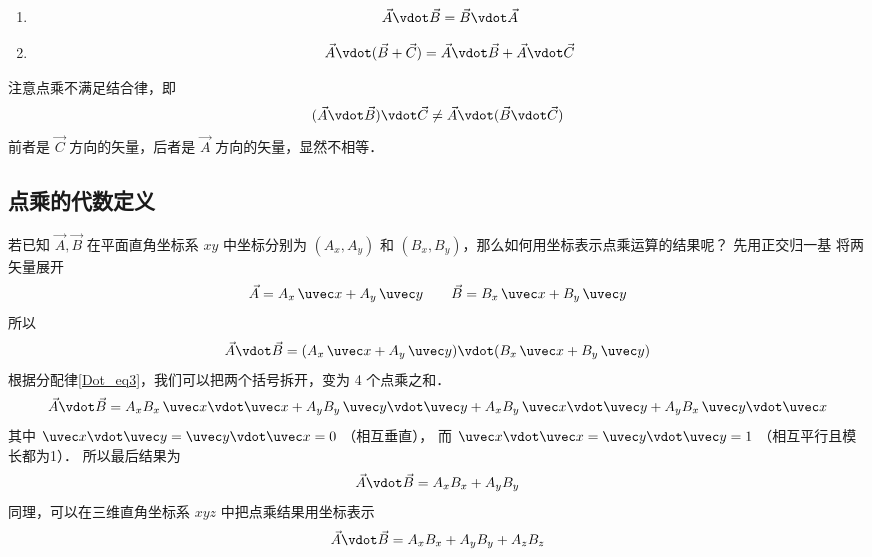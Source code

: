 \begin{enumerate}
\item {}
\begin{equation}
\vec A \vdot \vec B = \vec B \vdot \vec A
\end{equation}

\item {}
\begin{equation}\label{Dot_eq3}
\vec A \vdot (\vec B + \vec C) = \vec A \vdot \vec B + \vec A \vdot \vec C
\end{equation}
\end{enumerate}

注意点乘不满足结合律，即
\begin{equation}
(\vec A \vdot \vec B) \vdot \vec C \ne  \vec A \vdot (\vec B \vdot \vec C)
\end{equation}
前者是 $\vec C$ 方向的矢量，后者是 $\vec A$ 方向的矢量，显然不相等．

\subsection{点乘的代数定义}

若已知 $\vec A, \vec B$ 在平面直角坐标系 $xy$ 中坐标分别为 $(A_x, A_y)$ 和  $(B_x, B_y)$，那么如何用坐标表示点乘运算的结果呢？ 先用正交归一基 将两矢量展开 %
\begin{equation}
\vec A = A_x \,\uvec x + A_y \,\uvec y \qquad \vec B = B_x \,\uvec x + B_y \,\uvec y
\end{equation}
所以
\begin{equation}
\vec A \vdot \vec B = (A_x \,\uvec x + A_y \,\uvec y) \vdot (B_x \,\uvec x + B_y \,\uvec y)
\end{equation}
根据分配律\autoref{Dot_eq3}，我们可以把两个括号拆开，变为 4 个点乘之和． 
\begin{equation}
\vec A \vdot \vec B = A_x B_x \,\uvec x \vdot \uvec x + A_y B_y \,\uvec y \vdot \uvec y + A_x B_y \,\uvec x \vdot \uvec y + A_y B_x \,\uvec y \vdot \uvec x
\end{equation}
其中 $\uvec x \vdot \uvec y = \uvec y \vdot \uvec x = 0$ （相互垂直）， 而 $\uvec x \vdot \uvec x = \uvec y \vdot \uvec y = 1$ （相互平行且模长都为1）． 所以最后结果为
\begin{equation}
\vec A \vdot \vec B = A_x B_x + A_y B_y
\end{equation}
同理，可以在三维直角坐标系 $xyz$ 中把点乘结果用坐标表示
\begin{equation}
\vec A \vdot \vec B = A_x B_x + A_y B_y + A_z B_z	
\end{equation}

